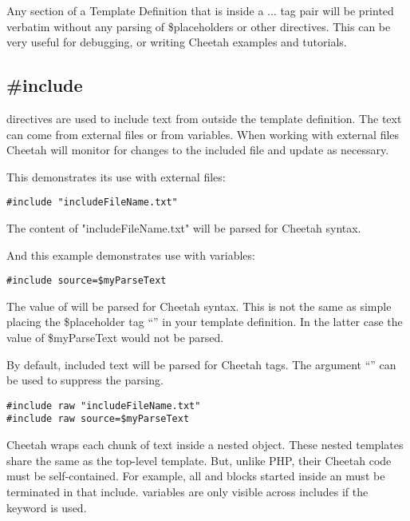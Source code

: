 Any section of a Template Definition that is inside a  ...
 tag pair will be printed verbatim without any parsing of
\$placeholders or other directives. This can be very useful for debugging, or
writing Cheetah examples and tutorials.


\subsection{\#include}
\label{output.include}

 directives are used to include text from outside the template
definition.  The text can come from external files or from 
variables.  When working with external files Cheetah will monitor for changes to
the included file and update as necessary.  

This demonstrates its use with external files:
\begin{verbatim}
#include "includeFileName.txt"
\end{verbatim}
The content of "includeFileName.txt" will be parsed for Cheetah syntax.

And this example demonstrates use with  variables:
\begin{verbatim}
#include source=$myParseText
\end{verbatim}
The value of  will be parsed for Cheetah syntax. This is not
the same as simple placing the \$placeholder tag ``'' in
your template definition.  In the latter case the value of \$myParseText would
not be parsed.

By default, included text will be parsed for Cheetah tags.  The argument
``'' can be used to suppress the parsing.

\begin{verbatim}
#include raw "includeFileName.txt"
#include raw source=$myParseText
\end{verbatim}

Cheetah wraps each chunk of  text inside a nested
 object.  These nested templates share the same 
as the top-level template. But, unlike PHP, their Cheetah code must be
self-contained.  For example, all  and  blocks started
inside an  must be terminated in that include. 
variables are only visible across includes if the  keyword is
used.



